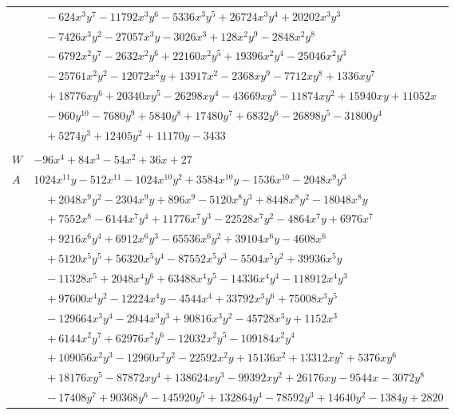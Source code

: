 \documentclass[11pt]{article}
\begin{document}
\begin{longtable}{@{}ll@{}}
 & $\quad -624x^{3}y^{7}-11792x^{3}y^{6}-5336x^{3}y^{5}+26724x^{3}y^{4}+20202x^{3}y^{3}$\\
 & $\quad -7426x^{3}y^{2}-27057x^{3}y-3026x^{3}+128x^{2}y^{9}-2848x^{2}y^{8}$\\
 & $\quad -6792x^{2}y^{7}-2632x^{2}y^{6}+22160x^{2}y^{5}+19396x^{2}y^{4}-25046x^{2}y^{3}$\\
 & $\quad -25761x^{2}y^{2}-12072x^{2}y+13917x^{2}-2368xy^{9}-7712xy^{8}+1336xy^{7}$\\
 & $\quad +18776xy^{6}+20340xy^{5}-26298xy^{4}-43669xy^{3}-11874xy^{2}+15940xy+11052x$\\
 & $\quad -960y^{10}-7680y^{9}+5840y^{8}+17480y^{7}+6832y^{6}-26898y^{5}-31800y^{4}$\\
 & $\quad +5274y^{3}+12405y^{2}+11170y-3433$\\
\addlinespace[3pt]
\multicolumn{2}{@{}l}{$i=9$, $m=4$, neighbours $43,1,6,13,17,20,25,28,33,34,39$}\\
$W$ & $-96x^{4}+84x^{3}-54x^{2}+36x+27$\\
$A$ & $1024x^{11}y-512x^{11}-1024x^{10}y^{2}+3584x^{10}y-1536x^{10}-2048x^{9}y^{3}$\\
 & $\quad +2048x^{9}y^{2}-2304x^{9}y+896x^{9}-5120x^{8}y^{3}+8448x^{8}y^{2}-18048x^{8}y$\\
 & $\quad +7552x^{8}-6144x^{7}y^{4}+11776x^{7}y^{3}-22528x^{7}y^{2}-4864x^{7}y+6976x^{7}$\\
 & $\quad +9216x^{6}y^{4}+6912x^{6}y^{3}-65536x^{6}y^{2}+39104x^{6}y-4608x^{6}$\\
 & $\quad +5120x^{5}y^{5}+56320x^{5}y^{4}-87552x^{5}y^{3}-5504x^{5}y^{2}+39936x^{5}y$\\
 & $\quad -11328x^{5}+2048x^{4}y^{6}+63488x^{4}y^{5}-14336x^{4}y^{4}-118912x^{4}y^{3}$\\
 & $\quad +97600x^{4}y^{2}-12224x^{4}y-4544x^{4}+33792x^{3}y^{6}+75008x^{3}y^{5}$\\
 & $\quad -129664x^{3}y^{4}-2944x^{3}y^{3}+90816x^{3}y^{2}-45728x^{3}y+1152x^{3}$\\
 & $\quad +6144x^{2}y^{7}+62976x^{2}y^{6}-12032x^{2}y^{5}-109184x^{2}y^{4}$\\
 & $\quad +109056x^{2}y^{3}-12960x^{2}y^{2}-22592x^{2}y+15136x^{2}+13312xy^{7}+5376xy^{6}$\\
 & $\quad +18176xy^{5}-87872xy^{4}+138624xy^{3}-99392xy^{2}+26176xy-9544x-3072y^{8}$\\
 & $\quad -17408y^{7}+90368y^{6}-145920y^{5}+132864y^{4}-78592y^{3}+14640y^{2}-1384y+2820$\\

\end{longtable}
\end{document}
